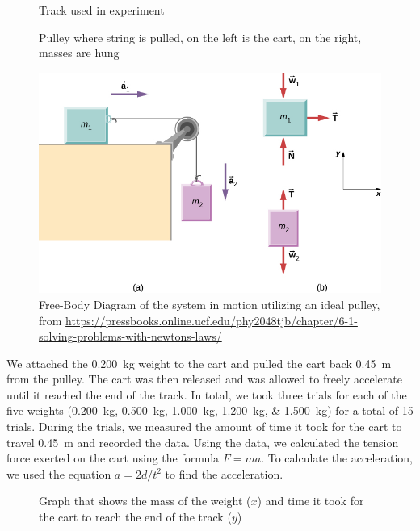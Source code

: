 ﻿\documentclass[reprint,amsmath,amssymb,aps]{revtex4-2}
\begin{document}
\begin{figure}
\caption{Track used in experiment}
\label{fig:1}
\end{figure}

\begin{figure}
\caption{Pulley where string is pulled, on the left is the cart, on the right, masses are hung}
\label{fig:2}
\end{figure}
  
\begin{figure}
\begin{center}
\includegraphics[width=\columnwidth]{CNX_UPhysics_06_01_Table.jpg}
\end{center}
\caption{Free-Body Diagram of the system in motion utilizing an ideal pulley, from \url{https://pressbooks.online.ucf.edu/phy2048tjb/chapter/6-1-solving-problems-with-newtons-laws/}}
\label{fig:3}
\end{figure}

We attached the \qty{0.200}{\kilo\gram} weight to the cart and pulled the cart back \qty{0.45}{\meter} from the pulley. The cart was then released and was allowed to freely accelerate until it reached the end of the track. In total, we took three trials for each of the five weights (\qtylist{0.200;0.500;1.000;1.200;1.500}{\kilo\gram}) for a total of 15 trials. During the trials, we measured the amount of time it took for the cart to travel \qty{0.45}{\meter} and recorded the data. Using the data, we calculated the tension force exerted on the cart using the formula $F=ma$. To calculate the acceleration, we used the equation $a=2d/t^2$ to find the acceleration.

\begin{figure}
\begin{center}

\end{center}
\caption{Graph that shows the mass of the weight ($x$) and time it took for the cart to reach the end of the track ($y$)}
\label{fig:4}
\end{figure}
\end{document}
